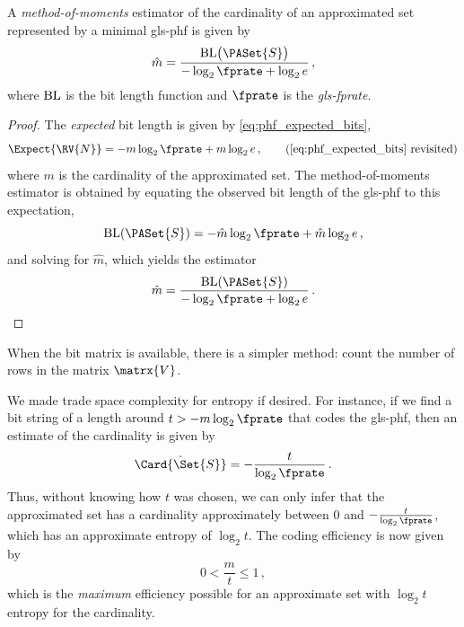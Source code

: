 \documentclass[ ../main.tex]{subfiles}
\begin{document}
\begin{theorem}
\label{thm:phf_mom_estimator}
A \emph{method-of-moments} estimator of the cardinality of an approximated set represented by a minimal \gls{gls-phf} is given by
\begin{equation}
    \hat{m} = \frac{\BL\!\left(\PASet{S}\right)}{-\log_2 \fprate + \log_2 e}\,,
\end{equation}
where $\operatorname{BL}$ is the bit length function and $\fprate$ is the \emph{\gls{gls-fprate}}.
\end{theorem}
\begin{proof}
The \emph{expected} bit length is given by \cref{eq:phf_expected_bits},
\begin{equation*}
    \Expect{\RV{N}} = -m \log_2 \fprate + m \log_2 e\,,
    \tag{\ref{eq:phf_expected_bits} revisited}
\end{equation*}
where $m$ is the cardinality of the approximated set. The method-of-moments estimator is obtained by equating the observed bit length of the \gls{gls-phf} to this expectation,
\begin{equation}
    \BL(\PASet{S}) = -\hat{m} \log_2 \fprate + \hat{m} \log_2 e\,,
\end{equation}
and solving for $\hat{m}$, which yields the estimator
\begin{equation}
    \hat{m} = \frac{\BL(\PASet{S})}{-\log_2 \fprate + \log_2 e}\,.
\end{equation}
\end{proof}
When the bit matrix is available, there is a simpler method: count the number of rows in the matrix $\matrx{V}$.

We made trade space complexity for entropy if desired. For instance, if we find a bit string of a length around $t > -m \log_2 \fprate$ that codes the \gls{gls-phf}, then an estimate of the cardinality is given by
\begin{equation}
    \hat{\Card{\Set{S}}} = -\frac{t}{\log_2 \fprate}\,.
\end{equation}
Thus, without knowing how $t$ was chosen, we can only infer that the approximated set has a cardinality approximately between $0$ and $-\frac{t}{\log_2 \fprate}$, which has an approximate entropy of $\log_2 t$. The coding efficiency is now given by
\begin{equation}
    0 < \frac{m}{t} \leq 1\,,
\end{equation}
which is the \emph{maximum} efficiency possible for an approximate set with $\log_2 t$ entropy for the cardinality.
\end{document}
